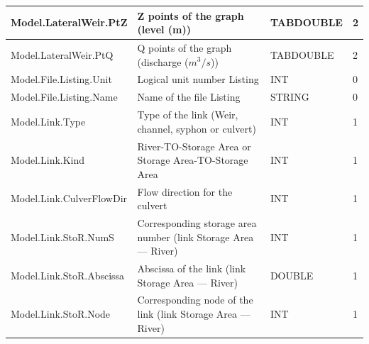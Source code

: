 \documentclass[a4paper,11pt]{article}
\begin{document}
\begin{landscape}
\begin{table}[ht]
\begin{center}
\begin{tabular}{|l|l|l|l|}
\hline  Model.LateralWeir.PtZ & Z points of the graph (level (m)) & TABDOUBLE & 2 \\
\hline  Model.LateralWeir.PtQ & Q points of the graph (discharge ($m^3/s$)) & TABDOUBLE & 2 \\
\hline  Model.File.Listing.Unit & Logical unit number Listing & INT & 0 \\
\hline  Model.File.Listing.Name & Name of the file Listing & STRING & 0 \\
\hline  Model.Link.Type & Type of the link (Weir, channel, syphon or culvert) & INT & 1 \\
\hline  Model.Link.Kind & River-TO-Storage Area or Storage Area-TO-Storage Area & INT & 1 \\
\hline  Model.Link.CulverFlowDir & Flow direction for the culvert & INT & 1 \\
\hline  Model.Link.StoR.NumS & Corresponding storage area number (link Storage Area --- River) & INT & 1 \\
\hline  Model.Link.StoR.Abscissa & Abscissa of the link (link Storage Area --- River) & DOUBLE & 1 \\
\hline  Model.Link.StoR.Node & Corresponding node of the link (link Storage Area --- River) & INT & 1 \\
\hline

\end{tabular} 
\end{center}
\end{table}
\begin{table}[ht]
\begin{center}
\begin{tabular}{|l|l|l|l|}


\end{tabular}
\end{center}
\end{table}
\end{landscape}
\end{document}
